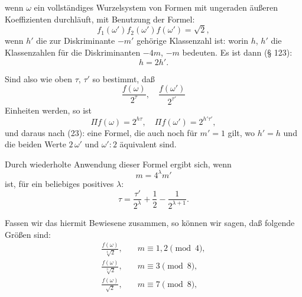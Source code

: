 
wenn $\omega$ ein vollständiges Wurzelsystem von Formen mit ungeraden
äußeren Koeffizienten durchläuft, mit Benutzung der Formel:
\[
f_1(\omega')f_2(\omega')f(\omega') = \sqrt{2},
\]
wenn $h'$ die zur Diskriminante $-m'$ gehörige Klassenzahl ist:
worin $h$, $h'$ die Klassenzahlen für die Diskriminanten $-4m$, $-m$
bedeuten. Es ist dann (§ 123):
\[
h = 2h'.
\]

Sind also wie oben $\tau$, $\tau'$ so bestimmt, daß
\[
\frac{f(\omega)}{2^\tau}, \quad \frac{f(\omega')}{2^{\tau'}}
\]
Einheiten werden, so ist
\[
\Pi f(\omega) = 2^{h\tau}, \quad \Pi f(\omega') = 2^{h'\tau'},
\]
und daraus nach (23):
eine Formel, die auch noch für $m' = 1$ gilt, wo $h' = h$ und
die beiden Werte $2\,\omega'$ und $\omega' : 2$ äquivalent sind.

Durch wiederholte Anwendung dieser Formel ergibt sich, wenn
\[
m = 4^\lambda m'
\]
ist, für ein beliebiges positives $\lambda$:
\[
\tau = \frac{\tau'}{2^\lambda} + \frac{1}{2} - \frac{1}{2^{\lambda+1}}.
\]

Fassen wir das hiermit Bewiesene zusammen, so können wir
sagen, daß folgende Größen  sind:
\[
\begin{aligned}
\frac{f(\omega)}{\sqrt[4]{2}}, & \quad m \equiv 1, 2 \pmod 4, \\
\frac{f(\omega)}{\sqrt[3]{2}}, & \quad m \equiv 3 \pmod 8, \\
\frac{f(\omega)}{\sqrt{2}}, & \quad m \equiv 7 \pmod 8,
\end{aligned}
\]

